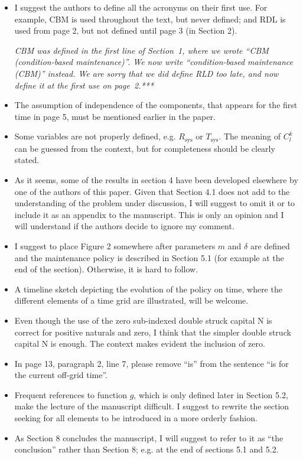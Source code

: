 \documentclass[authoryear]{elsarticle}
\newcommand{\Tsys}{T_\text{sys}}
\newcommand{\Rsys}{R_\text{sys}}
\begin{document}
\begin{itemize}
\item I suggest the authors to define all the acronyms on their first use. For example, CBM is used throughout the text, but never defined; and RDL is used from page 2, but not defined until page 3 (in Section 2).

\smallskip

\emph{CBM was defined in the first line of Section~1, where we wrote ``CBM (condition-based maintenance)''.
We now write ``condition-based maintenance (CBM)'' instead.
We are sorry that we did define RLD too late, and now define it at the first use on page~2.***}

\item The assumption of independence of the components, that appears for the first time in page 5, must be mentioned earlier in the paper.

\item Some variables are not properly defined, e.g. $\Rsys$ or $\Tsys$. The meaning of $C^k_l$ can be guessed from the context, but for completeness should be clearly stated.

\item As it seems, some of the results in section 4 have been developed elsewhere by one of the authors of this paper. Given that Section 4.1 does not add to the understanding of the problem under discussion, I will suggest to omit it or to include it as an appendix to the manuscript. This is only an opinion and I will understand if the authors decide to ignore my comment.

\item I suggest to place Figure 2 somewhere after parameters $m$ and $\delta$ are defined and the maintenance policy is described in Section 5.1 (for example at the end of the section). Otherwise, it is hard to follow.

\item A timeline sketch depicting the evolution of the policy on time, where the different elements of a time grid are illustrated, will be welcome.

\item Even though the use of the zero sub-indexed double struck capital N is correct for positive naturals and zero, I think that the simpler double struck capital N is enough. The context makes evident the inclusion of zero.

\item In page 13, paragraph 2, line 7, please remove “is” from the sentence “is for the current off-grid time”.

\item Frequent references to function $g$, which is only defined later in Section 5.2, make the lecture of the manuscript difficult. I suggest to rewrite the section seeking for all elements to be introduced in a more orderly fashion.

\item As Section 8 concludes the manuscript, I will suggest to refer to it as “the conclusion” rather than Section 8; e.g. at the end of sections 5.1 and 5.2.
\end{itemize}
\end{document}
